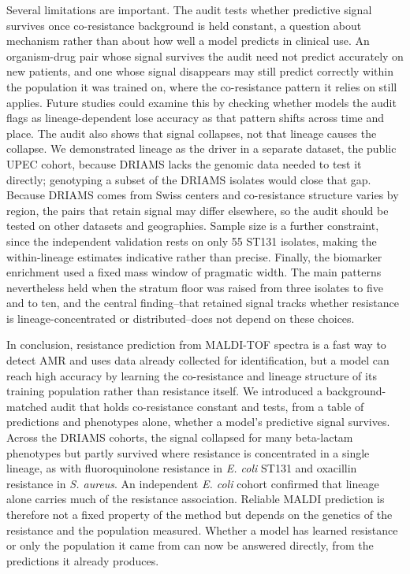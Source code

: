 \documentclass[11pt]{article}
\begin{document}
Several limitations are important. The audit tests whether predictive signal survives once co-resistance background is held constant, a question about mechanism rather than about how well a model predicts in clinical use. An organism-drug pair whose signal survives the audit need not predict accurately on new patients, and one whose signal disappears may still predict correctly within the population it was trained on, where the co-resistance pattern it relies on still applies. Future studies could examine this by checking whether models the audit flags as lineage-dependent lose accuracy as that pattern shifts across time and place. The audit also shows that signal collapses, not that lineage causes the collapse. We demonstrated lineage as the driver in a separate dataset, the public UPEC cohort, because DRIAMS lacks the genomic data needed to test it directly; genotyping a subset of the DRIAMS isolates would close that gap. Because DRIAMS comes from Swiss centers and co-resistance structure varies by region, the pairs that retain signal may differ elsewhere, so the audit should be tested on other datasets and geographies. Sample size is a further constraint, since the independent validation rests on only 55 ST131 isolates, making the within-lineage estimates indicative rather than precise. Finally, the biomarker enrichment used a fixed mass window of pragmatic width. The main patterns nevertheless held when the stratum floor was raised from three isolates to five and to ten, and the central finding--that retained signal tracks whether resistance is lineage-concentrated or distributed--does not depend on these choices.

In conclusion, resistance prediction from MALDI-TOF spectra is a fast way to detect AMR and uses data already collected for identification, but a model can reach high accuracy by learning the co-resistance and lineage structure of its training population rather than resistance itself. We introduced a background-matched audit that holds co-resistance constant and tests, from a table of predictions and phenotypes alone, whether a model's predictive signal survives. Across the DRIAMS cohorts, the signal collapsed for many beta-lactam phenotypes but partly survived where resistance is concentrated in a single lineage, as with fluoroquinolone resistance in \textit{E. coli} ST131 and oxacillin resistance in \textit{S. aureus}. An independent \textit{E. coli} cohort confirmed that lineage alone carries much of the resistance association. Reliable MALDI prediction is therefore not a fixed property of the method but depends on the genetics of the resistance and the population measured. Whether a model has learned resistance or only the population it came from can now be answered directly, from the predictions it already produces.
\end{document}

